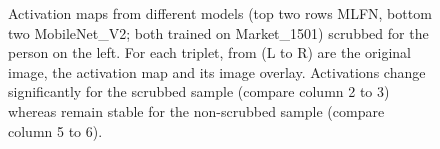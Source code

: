 \begin{figure}
\begin{subfigure}[b]{0.98\textwidth}
        
    \end{subfigure}
    
    
        
    
    
    \caption[Re-ID Activation Maps]{\label{fig:reid_sup}Activation maps from different models (top two rows MLFN, bottom two MobileNet\_V2; both trained on Market\_1501) scrubbed for the person on the left. For each triplet, from (L to R) are the original image, the activation map and its image overlay. Activations change significantly for the scrubbed sample (compare column 2 to 3) whereas remain stable for the non-scrubbed sample (compare column 5 to 6).}
\end{figure}






